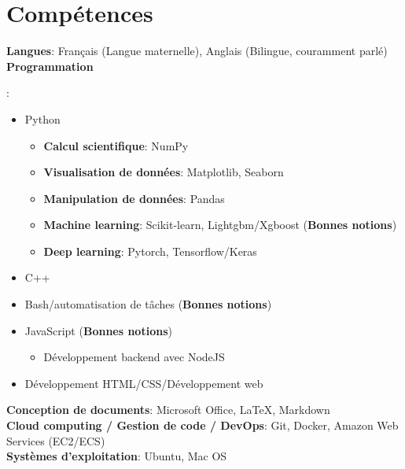 \documentclass[A4,11pt]{article}
\begin{document}
\section{Compétences}
\begin{itemize}[leftmargin=0.5cm, label={}]
  \small{\item{
\textbf{Langues}{: Français (Langue maternelle), Anglais (Bilingue, couramment parlé)} \\
\textbf{Programmation}{:
          \begin{itemize}
\item Python \\
                  \begin{itemize}
\item \textbf{Calcul scientifique}: NumPy
\item \textbf{Visualisation de données}: Matplotlib, Seaborn
\item \textbf{Manipulation de données}: Pandas
\item \textbf{Machine learning}: Scikit-learn, Lightgbm/Xgboost (\textbf{Bonnes notions})
\item \textbf{Deep learning}: Pytorch, Tensorflow/Keras 

                  \end{itemize}
\item C++ 
\item Bash/automatisation de tâches (\textbf{Bonnes notions})

\item JavaScript (\textbf{Bonnes notions})
                  \begin{itemize}
\item Développement backend avec NodeJS
                  \end{itemize}
\item Développement HTML/CSS/Développement web  

          \end{itemize}

        }
\textbf{Conception de documents}{: Microsoft Office, LaTeX, Markdown} \\
\textbf{Cloud computing / Gestion de code / DevOps}{: Git, Docker, Amazon Web Services (EC2/ECS)} \\
\textbf{Systèmes d'exploitation}{: Ubuntu, Mac OS} \\
        }}
\end{itemize}

\end{document}
